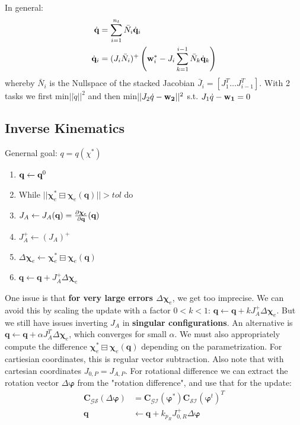 \documentclass[a4paper, 8pt]{extarticle}
\newcommand{\mrot}[2]{ \textbf{#1}_{ \mathcal{#2} } }
\begin{document}
\begin{multicols*}{3}
In general:
\begin{align*}
\dot{\mathbf q} &= \sum_{i=1}^{n_t}\bar N_i \dot{\mathbf q}_i \\ 
\dot{\mathbf q}_i &= (J_i \bar N_i)^+ \left( \textbf w_i^* - J_i \sum_{k=1}^{i-1}\bar N_k \dot{\mathbf q}_k \right)
\end{align*}
whereby $\bar N_i$ is the Nullspace of the stacked Jacobian $\bar J_{i}=[J_{1}^{T} \ldots J_{i-1}^{T}]$. With 2 tasks we first min$||\dot{q}||^2$ and then min$||J_{2}\dot{q}-{\bf w_{2}}||^2$ s.t. $J_{1}\dot{q}-{\bf w_{1}}=0$


\subsection{Inverse Kinematics}
Genernal goal: $q=q(\chi^*)$
\begin{enumerate}
\item $\mathbf q \leftarrow \textbf q^0$
\item While $||\bm\chi_e^* \boxminus \bm\chi_e(\mathbf q)|| > tol$ do
\item \hspace{1em} $J_A \leftarrow J_A(\textbf q) = \frac{\partial \bm\chi_e}{\partial \textbf q}(\textbf q)$
\item \hspace{1em} $J_A^+ \leftarrow (J_A)^+$
\item \hspace{1em} $\Delta\bm\chi_e \leftarrow \bm\chi_e^* \boxminus \bm\chi_e(\mathbf q)$
\item \hspace{1em} $\mathbf q \leftarrow \mathbf q + J_A^+\Delta\bm\chi_e$
\end{enumerate}
One issue is that \textbf{for very large errors $\Delta\bm\chi_e$}, we get too imprecise. We can avoid this by scaling the update with a factor $0 < k < 1$: $\mathbf q \leftarrow \mathbf q + kJ_A^+\Delta\bm\chi_e$. But we still have issues inverting $J_A$ in \textbf{singular configurations}. An alternative is $\mathbf q \leftarrow \mathbf q + \alpha J_A^T\Delta\bm\chi_e$, which converges for small $\alpha$.
We must also appropriately compute the difference $\bm\chi_e^* \boxminus \bm\chi_e(\mathbf q)$ depending on the parametrization. For cartiesian coordinates, this is regular vector subtraction. Also note that with cartesian coordinates $J_{0,P} = J_{A,P}$. For rotational difference we can extract the rotation vector $\Delta\bm\varphi$ from the "rotation difference", and use that for the update:
\begin{align*}
\mrot{C}{GS}(\Delta\bm\varphi) &= \mrot{C}{GI}(\bm\varphi^*)\mrot{C}{SI}(\bm\varphi^t)^{T}\\
\mathbf q &\leftarrow \mathbf q + k_{p_R}J_{0,R}^+\Delta\bm\varphi
\end{align*}




\end{multicols*}
\end{document}
